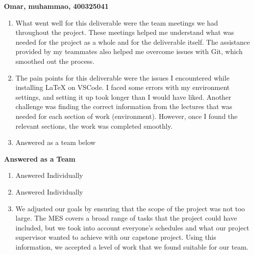 \documentclass{article}
\begin{document}
\textbf{Omar, muhammao, 400325041} 
\begin{enumerate}
\item What went well for this deliverable were the team meetings we had throughout the project. These meetings helped me understand what was needed for the project as a whole and for the deliverable itself. The assistance provided by my teammates also helped me overcome issues with Git, which smoothed out the process.
\item The pain points for this deliverable were the issues I encountered while installing LaTeX on VSCode. I faced some errors with my environment settings, and setting it up took longer than I would have liked. Another challenge was finding the correct information from the lectures that was needed for each section of work (environment). However, once I found the relevant sections, the work was completed smoothly.
\item Answered as a team below
\end{enumerate}  

\textbf{Answered as a Team} 
\begin{enumerate}
\item Answered Individually 
\item Answered Individually
\item We adjusted our goals by ensuring that the scope of the project was not too large. The MES covers a broad range of tasks that the project could have included, but we took into account everyone’s schedules and what our project supervisor wanted to achieve with our capstone project. Using this information, we accepted a level of work that we found suitable for our team.

\end{enumerate}  
\end{document}
